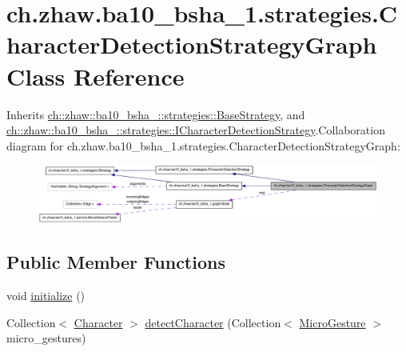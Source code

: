 \hypertarget{classch_1_1zhaw_1_1ba10__bsha__1_1_1strategies_1_1CharacterDetectionStrategyGraph}{
\section{ch.zhaw.ba10\_\-bsha\_\-1.strategies.CharacterDetectionStrategyGraph Class Reference}
\label{classch_1_1zhaw_1_1ba10__bsha__1_1_1strategies_1_1CharacterDetectionStrategyGraph}
}


Inherits \hyperlink{classch_1_1zhaw_1_1ba10__bsha__1_1_1strategies_1_1BaseStrategy}{ch::zhaw::ba10\_\-bsha\_::strategies::BaseStrategy}, and \hyperlink{interfacech_1_1zhaw_1_1ba10__bsha__1_1_1strategies_1_1ICharacterDetectionStrategy}{ch::zhaw::ba10\_\-bsha\_::strategies::ICharacterDetectionStrategy}.Collaboration diagram for ch.zhaw.ba10\_\-bsha\_\-1.strategies.CharacterDetectionStrategyGraph:\nopagebreak
\begin{figure}[H]
\begin{center}
\leavevmode
\includegraphics[width=400pt]{classch_1_1zhaw_1_1ba10__bsha__1_1_1strategies_1_1CharacterDetectionStrategyGraph__coll__graph}
\end{center}
\end{figure}
\subsection*{Public Member Functions}
\begin{DoxyCompactItemize}
\item 
void \hyperlink{classch_1_1zhaw_1_1ba10__bsha__1_1_1strategies_1_1CharacterDetectionStrategyGraph_af9451b15c51430529b038840360a21c6}{initialize} ()
\item 
Collection$<$ \hyperlink{classch_1_1zhaw_1_1ba10__bsha__1_1_1Character}{Character} $>$ \hyperlink{classch_1_1zhaw_1_1ba10__bsha__1_1_1strategies_1_1CharacterDetectionStrategyGraph_af5d1202b6a9878b247cf4c5176102dd5}{detectCharacter} (Collection$<$ \hyperlink{classch_1_1zhaw_1_1ba10__bsha__1_1_1service_1_1MicroGesture}{MicroGesture} $>$ micro\_\-gestures)
\end{DoxyCompactItemize}
